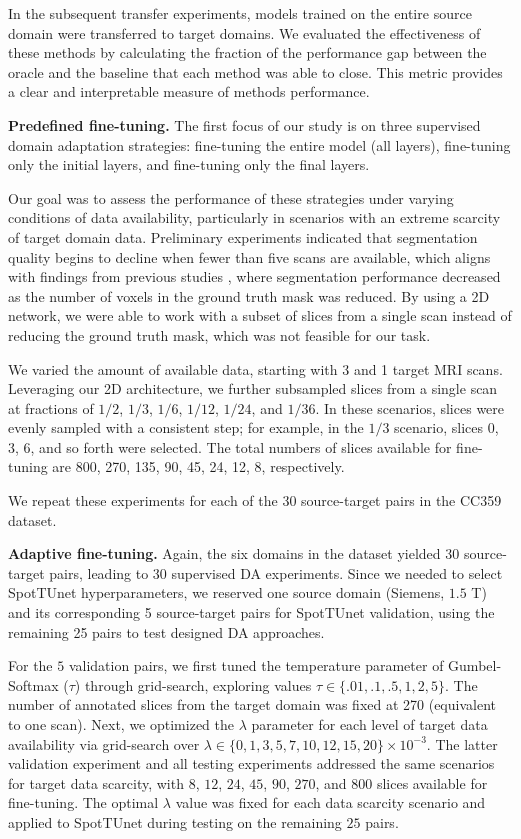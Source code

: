 In the subsequent transfer experiments, models trained on the entire source domain were transferred to target domains. We evaluated the effectiveness of these methods by calculating the fraction of the performance gap between the oracle and the baseline that each method was able to close. This metric provides a clear and interpretable measure of methods performance.


\textbf{Predefined fine-tuning.} The first focus of our study is on three supervised domain adaptation strategies: fine-tuning the entire model (all layers), fine-tuning only the initial layers, and fine-tuning only the final layers.

Our goal was to assess the performance of these strategies under varying conditions of data availability, particularly in scenarios with an extreme scarcity of target domain data. Preliminary experiments indicated that segmentation quality begins to decline when fewer than five scans are available, which aligns with findings from previous studies \cite{valverde2019one}, where segmentation performance decreased as the number of voxels in the ground truth mask was reduced. By using a 2D network, we were able to work with a subset of slices from a single scan instead of reducing the ground truth mask, which was not feasible for our task.

We varied the amount of available data, starting with 3 and 1 target MRI scans. Leveraging our 2D architecture, we further subsampled slices from a single scan at fractions of $1/2$, $1/3$, $1/6$, $1/12$, $1/24$, and $1/36$. In these scenarios, slices were evenly sampled with a consistent step; for example, in the $1/3$ scenario, slices 0, 3, 6, and so forth were selected. The total numbers of slices available for fine-tuning are 800, 270, 135, 90, 45, 24, 12, 8, respectively.

We repeat these experiments for each of the 30 source-target pairs in the CC359 dataset.


\textbf{Adaptive fine-tuning.} Again, the six domains in the dataset yielded $30$ source-target pairs, leading to $30$ supervised DA experiments. Since we needed to select SpotTUnet hyperparameters, we reserved one source domain (Siemens, $1.5$ T) and its corresponding 5 source-target pairs for SpotTUnet validation, using the remaining 25 pairs to test designed DA approaches.

For the $5$ validation pairs, we first tuned the temperature parameter of Gumbel-Softmax ($\tau$) through grid-search, exploring values $\tau \in \{ .01, .1 , .5, 1, 2, 5 \}$. The number of annotated slices from the target domain was fixed at 270 (equivalent to one scan). Next, we optimized the $\lambda$ parameter for each level of target data availability via grid-search over $\lambda \in \{0, 1, 3 , 5, 7, 10, 12, 15, 20 \} \times 10^{-3}$. The latter validation experiment and all testing experiments addressed the same scenarios for target data scarcity, with $8$, $12$, $24$, $45$, $90$, $270$, and $800$ slices available for fine-tuning. The optimal $\lambda$ value was fixed for each data scarcity scenario and applied to SpotTUnet during testing on the remaining $25$ pairs.

